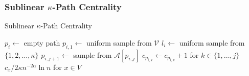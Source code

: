 \documentclass{beamer}
\begin{document}
\begin{frame}
\frametitle{Sublinear $\kappa$-Path Centrality}

\begin{algorithm}[H]
\caption{Sublinear $\kappa$-Path Centrality}\label{alg:sublinear_kpath}
\begin{algorithmic}[1]
	\State $p_i \gets$ empty path
	\State $p_{i,1} \gets$ uniform sample from $\mathcal{V}$
	\State $l_i \gets$ uniform sample from $\{1, 2, \dots, \kappa \}$
\EndFor
{}
\EndFor
{} 
			\State $p_{i,j+1} \gets$ sample from $\mathcal{A}[p_{i,j}]$
			\EndIf
			\State $c_{p_{i,k}} \gets c_{p_{i,k}} + 1$ for $k \in \{1, \dots, j\}$
		\EndIf
	\EndParFor
\EndParFor
\State \Return $c_x /  2 \kappa n^{-2\alpha} \ln n$ for $x \in V$
\end{algorithmic}
\end{algorithm}



\end{frame}





\end{document}
